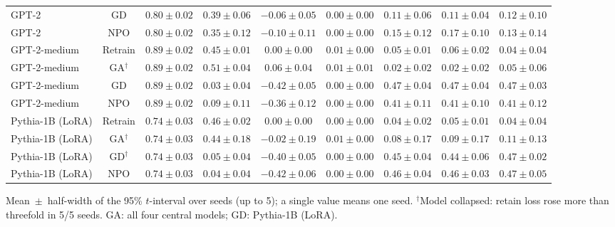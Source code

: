 {\begin{longtable}{@{\extracolsep{\fill}}lcccccccc@{}}
GPT-2 & GD & $0.80 \pm 0.02$ & $0.39 \pm 0.06$ & $-0.06 \pm 0.05$ & $0.00 \pm 0.00$ & $0.11 \pm 0.06$ & $0.11 \pm 0.04$ & $0.12 \pm 0.10$ \\
GPT-2 & NPO & $0.80 \pm 0.02$ & $0.35 \pm 0.12$ & $-0.10 \pm 0.11$ & $0.00 \pm 0.00$ & $0.15 \pm 0.12$ & $0.17 \pm 0.10$ & $0.13 \pm 0.14$ \\
GPT-2-medium & Retrain & $0.89 \pm 0.02$ & $0.45 \pm 0.01$ & $0.00 \pm 0.00$ & $0.01 \pm 0.00$ & $0.05 \pm 0.01$ & $0.06 \pm 0.02$ & $0.04 \pm 0.04$ \\
GPT-2-medium & GA$^{\dagger}$ & $0.89 \pm 0.02$ & $0.51 \pm 0.04$ & $0.06 \pm 0.04$ & $0.01 \pm 0.01$ & $0.02 \pm 0.02$ & $0.02 \pm 0.02$ & $0.05 \pm 0.06$ \\
GPT-2-medium & GD & $0.89 \pm 0.02$ & $0.03 \pm 0.04$ & $-0.42 \pm 0.05$ & $0.00 \pm 0.00$ & $0.47 \pm 0.04$ & $0.47 \pm 0.04$ & $0.47 \pm 0.03$ \\
GPT-2-medium & NPO & $0.89 \pm 0.02$ & $0.09 \pm 0.11$ & $-0.36 \pm 0.12$ & $0.00 \pm 0.00$ & $0.41 \pm 0.11$ & $0.41 \pm 0.10$ & $0.41 \pm 0.12$ \\
Pythia-1B (LoRA) & Retrain & $0.74 \pm 0.03$ & $0.46 \pm 0.02$ & $0.00 \pm 0.00$ & $0.00 \pm 0.00$ & $0.04 \pm 0.02$ & $0.05 \pm 0.01$ & $0.04 \pm 0.04$ \\
Pythia-1B (LoRA) & GA$^{\dagger}$ & $0.74 \pm 0.03$ & $0.44 \pm 0.18$ & $-0.02 \pm 0.19$ & $0.01 \pm 0.00$ & $0.08 \pm 0.17$ & $0.09 \pm 0.17$ & $0.11 \pm 0.13$ \\
Pythia-1B (LoRA) & GD$^{\dagger}$ & $0.74 \pm 0.03$ & $0.05 \pm 0.04$ & $-0.40 \pm 0.05$ & $0.00 \pm 0.00$ & $0.45 \pm 0.04$ & $0.44 \pm 0.06$ & $0.47 \pm 0.02$ \\
Pythia-1B (LoRA) & NPO & $0.74 \pm 0.03$ & $0.04 \pm 0.04$ & $-0.42 \pm 0.06$ & $0.00 \pm 0.00$ & $0.46 \pm 0.04$ & $0.46 \pm 0.03$ & $0.47 \pm 0.05$ \\
\end{longtable}
Mean~$\pm$~half-width of the 95\% $t$-interval over seeds (up to 5); a single value means one seed. $^{\dagger}$Model collapsed: retain loss rose more than threefold in 5/5 seeds. GA: all four central models; GD: Pythia-1B (LoRA).\par
}
